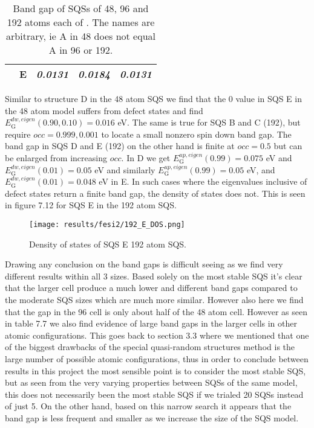 \begin{table}[H]
\begin{tabular}{@{}ccccc@{}}
\multicolumn{1}{c|}{}                     & \textbf{E} & \textit{0.0131}                                                                & \textit{0.0184}                                                                         & \textit{0.0131}                                                                          \\ \bottomrule 
\end{tabular}
\caption{Band gap of SQSs of 48, 96 and 192 atoms each of . The names are arbitrary, ie A in 48 does not equal A in 96 or 192.}
\end{table}

Similar to structure D in the 48 atom SQS we find that the 0 value in SQS E in the 48 atom model suffers from defect states and find $E_\text{G} ^{dw, eigen}(0.90, 0.10) = 0.016$ eV. The same is true for SQS B and C (192), but require $occ = 0.999, 0.001$ to locate a small nonzero spin down band gap. The band gap in SQS D and E (192) on the other hand is finite at $occ = 0.5$ but can be enlarged from increasing $occ$. In D we get $E_\text{G} ^{up, eigen}(0.99) = 0.075$ eV and $E_\text{G} ^{dw, eigen}(0.01) = 0.05$ eV and similarly $E_\text{G} ^{up, eigen}(0.99) = 0.05$ eV, and $E_\text{G} ^{dw, eigen}(0.01) = 0.048$ eV in E. In such cases where the eigenvalues inclusive of defect states return a finite band gap, the density of states does not. This is seen in figure 7.12 for SQS E in the 192 atom SQS. 

\begin{figure}
\centering
\texttt{[image: results/fesi2/192\_E\_DOS.png]}
\caption{Density of states of SQS E 192 atom SQS.}
\end{figure}    
 
Drawing any conclusion on the band gaps is difficult seeing as we find very different results within all 3 sizes. Based solely on the most stable SQS it's clear that the larger cell produce a much lower and different band gaps compared to the moderate SQS sizes which are much more similar. However also here we find that the gap in the 96 cell is only about half of the 48 atom cell. However as seen in table 7.7 we also find evidence of large band gaps in the larger cells in other atomic configurations. This goes back to section 3.3 where we mentioned that one of the biggest drawbacks of the special quasi-random structures method is the large number of possible atomic configurations, thus in order to conclude between results in this project the most sensible point is to consider the most stable SQS, but as seen from the very varying properties between SQSs of the same model, this does not necessarily been the most stable SQS if we trialed 20 SQSs instead of just 5. On the other hand, based on this narrow search it appears that the band gap is less frequent and smaller as we increase the size of the SQS model.    


